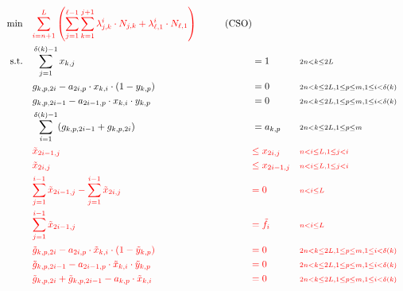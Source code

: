 \documentclass[runningheads]{llncs}
\newcommand{\HL}[1]{\textcolor{red}{#1}}
\begin{document}
\begingroup
\allowdisplaybreaks%
\begin{align*}
\min\quad        & \HL{\sum_{i=n+1}^L \left( \sum_{j=1}^{\ell-1} \sum_{k=1}^{j+1} \lambda^i_{j,k} \cdot N_{j,k} + \lambda^i_{\ell,1} \cdot N_{\ell,1} \right)} & \label{CS} \tag{CSO}\\
\text{s.t.}\quad & \sum_{j=1}^{\delta(k)- 1} x_{k,j}                                  && =     1              && {\scriptstyle 2n < k \leq 2L}\\
                 & g_{k,p,2i}   - a_{2i,p}   \cdot x_{k,i} \cdot (1-y_{k,p})          && =     0              && {\scriptstyle 2n < k \leq 2L, 1 \leq p \leq m, 1 \leq i < \delta(k)}\\
                 & g_{k,p,2i-1} - a_{2i-1,p} \cdot x_{k,i} \cdot y_{k,p}              && =     0              && {\scriptstyle 2n < k \leq 2L, 1 \leq p \leq m, 1 \leq i < \delta(k)}\\
                 & \sum_{i = 1}^{\delta(k) - 1} (g_{k,p,2i-1} + g_{k,p,2i})           && = a_{k,p}            && {\scriptstyle 2n < k \leq 2L, 1 \leq p \leq m}\\
                 & \HL{\tilde{x}_{2i-1,j}}                                            && \HL{\leq x_{2i,j}}   && \HL{\scriptstyle n < i \leq L, 1 \leq j < i}\\
                 & \HL{\tilde{x}_{2i,j}}                                              && \HL{\leq x_{2i-1,j}} && \HL{\scriptstyle n < i \leq L, 1 \leq j < i}\\
                 & \HL{\sum_{j=1}^{i-1} \tilde{x}_{2i-1,j} - \sum_{j=1}^{i-1} \tilde{x}_{2i,j}} && \HL{= 0}   && \HL{\scriptstyle n < i \leq L}\\
                 & \HL{\sum_{j=1}^{i-1} \tilde{x}_{2i-1,j}}                           && \HL{= \tilde{f}_i}   && \HL{\scriptstyle n < i \leq L}\\
                 & \HL{\tilde{g}_{k,p,2i}   - a_{2i,p}   \cdot \tilde{x}_{k,i} \cdot (1-\tilde{y}_{k,p})}     && \HL{=     0} && \HL{\scriptstyle 2n < k \leq 2L, 1 \leq p \leq m, 1 \leq i < \delta(k)}\\
                 & \HL{\tilde{g}_{k,p,2i-1} - a_{2i-1,p} \cdot \tilde{x}_{k,i} \cdot \tilde{y}_{k,p}}         && \HL{=     0} && \HL{\scriptstyle 2n < k \leq 2L, 1 \leq p \leq m, 1 \leq i < \delta(k)}\\
                 & \HL{\tilde{g}_{k,p,2i} + \tilde{g}_{k,p,2i-1} - a_{k,p} \cdot \tilde{x}_{k,i}} && \HL{= 0} && \HL{\scriptstyle 2n < k \leq 2L, 1 \leq p \leq m, 1 \leq i < \delta(k)}\\

\end{align*}
\end{document}
